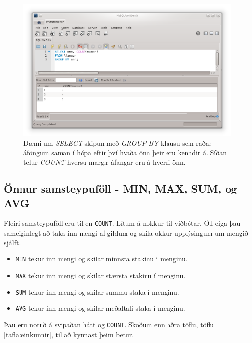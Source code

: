 \begin{figure}
\caption[GROUP BY og COUNT eftir önnum]{Dæmi um \emph{SELECT} skipun með \emph{GROUP BY} klausu sem raðar áföngum saman í hópa eftir því hvaða önn þeir eru kenndir á. Síðan telur \emph{COUNT} hversu margir áfangar eru á hverri önn.}
\label{mynd:workbench-group-by-onn}
\centering
\includegraphics[width=\linewidth]{myndir/workbench-group-by-onn}
\end{figure}

\subsection{Önnur samsteypuföll - MIN, MAX, SUM, og AVG}
\label{undirkafli:onnur-samsteypufoll}
Fleiri samsteypuföll eru til en \verb|COUNT|. Lítum á nokkur til viðbótar. Öll eiga þau sameiginlegt að taka inn mengi af gildum og skila okkur upplýsingum um mengið sjálft.

\begin{itemize}
 \item \verb|MIN| tekur inn mengi og skilar minnsta stakinu í menginu.
 \item \verb|MAX| tekur inn mengi og skilar stærsta stakinu í menginu.
 \item \verb|SUM| tekur inn mengi og skilar summu staka í menginu.
 \item \verb|AVG| tekur inn mengi og skilar meðaltali staka í menginu.
\end{itemize}

Þau eru notuð á svipaðan hátt og \verb|COUNT|. Skoðum enn aðra töflu, töflu \ref{tafla:einkunnir}, til að kynnast þeim betur.

